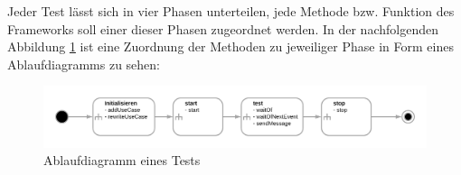 Jeder Test lässt sich in vier Phasen unterteilen, jede Methode bzw. 
Funktion des Frameworks soll einer dieser Phasen zugeordnet werden.
In der nachfolgenden Abbildung \ref{fig:TestFlow} 
ist eine Zuordnung der Methoden zu jeweiliger Phase in Form eines Ablaufdiagramms zu sehen:

\begin{figure}[H]
    \centering
    \includegraphics[width=1\textwidth]{./images/TestAblauf.png}
    \caption[Ablaufdiagramm eines Tests]{Ablaufdiagramm eines Tests}
    \label{fig:TestFlow}
\end{figure}